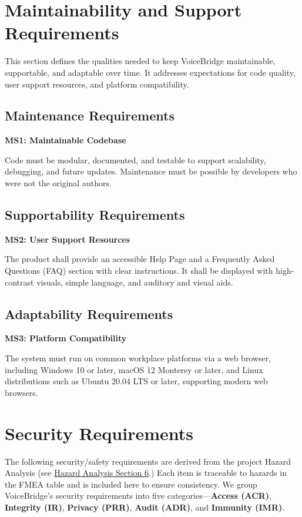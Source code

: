 \documentclass[11pt]{article}
\begin{document}
\section{Maintainability and Support Requirements}\label{sec:maintainability}
This section defines the qualities needed to keep VoiceBridge maintainable, supportable, and adaptable over time. It addresses expectations for code quality, user support resources, and platform compatibility.

\subsection{Maintenance Requirements}\label{subsec:maintenance}

\textbf{MS1: Maintainable Codebase}\label{req:MS1}

Code must be modular, documented, and testable to support scalability, debugging, and future updates. Maintenance must be possible by developers who were not the original authors. 
\subsection{Supportability Requirements}\label{subsec:supportability}

\textbf{MS2: User Support Resources}\label{req:MS2}

The product shall provide an accessible Help Page and a Frequently Asked Questions (FAQ) section with clear instructions. It shall be displayed with high-contrast visuals, simple language, and auditory and visual aids. 
\subsection{Adaptability Requirements}\label{subsec:adaptability}
\textbf{MS3: Platform Compatibility}\label{req:MS3}

The system must run on common workplace platforms via a web browser, including Windows 10 or later, macOS 12 Monterey or later, and Linux distributions such as Ubuntu 20.04 LTS or later, supporting modern web browsers.
\section{Security Requirements}
The following security/safety requirements are derived from the project Hazard Analysis (see \href{https://github.com/speech-buddies/VoiceBridge/blob/main/docs/HazardAnalysis/HazardAnalysis.pdf}{Hazard Analysis Section 6}.) Each item is traceable to hazards in the FMEA table and is included here to ensure consistency.
We group VoiceBridge’s security requirements into five categories—\textbf{Access (ACR)}, \textbf{Integrity (IR)}, \textbf{Privacy (PRR)}, \textbf{Audit (ADR)}, and \textbf{Immunity (IMR)}.
\end{document}
